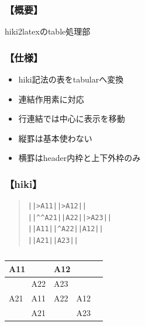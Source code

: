 
\subsubsection{【概要】}
hiki2latexのtable処理部

\subsubsection{【仕様】}\begin{itemize}
\item hiki記法の表をtabularへ変換
\item 連結作用素に対応
\item 行連結では中心に表示を移動
\item 縦罫は基本使わない
\item 横罫はheader内枠と上下外枠のみ
\end{itemize}
\subsubsection{【hiki】}\begin{quote}\begin{verbatim}
||>A11||>A12||
||^^A21||A22||>A23||
||A11||^A22||A12||
||A21||A23||
\end{verbatim}\end{quote}
\begin{table}[htbp]\begin{center}
\caption{}
\begin{tabular}{lllll}
\hline
\multicolumn{2}{l}{A11 }  &\multicolumn{2}{l}{A12 }  \\ \hline
 &A22  &\multicolumn{2}{l}{A23 }  \\
A21  &A11  &A22  &A12  \\
 &A21  & &A23  \\
\hline
\end{tabular}
\label{default}
\end{center}\end{table}

